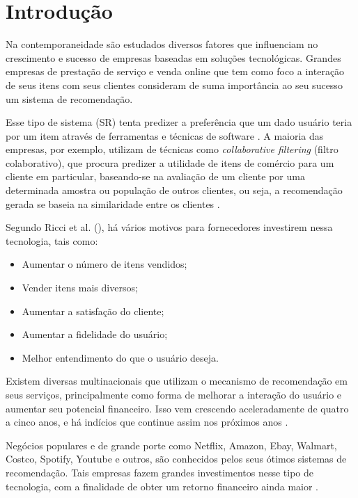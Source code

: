 \chapter{Introdução}

Na contemporaneidade são estudados diversos fatores que influenciam no crescimento e sucesso de empresas baseadas em soluções tecnológicas. Grandes empresas de prestação de serviço e venda online que tem como foco a interação de seus itens com seus clientes consideram de suma importância ao seu sucesso um sistema de recomendação.

Esse tipo de sistema (SR) tenta predizer a preferência que um dado usuário teria por um item através de ferramentas e técnicas de software \cite{souza:2014}. A maioria das empresas, por exemplo, utilizam de técnicas como \textit{collaborative filtering} (filtro colaborativo), que procura predizer a utilidade de itens de comércio para um cliente em particular, baseando-se na avaliação de um cliente por uma determinada amostra ou população de outros clientes, ou seja, a recomendação gerada se baseia na similaridade entre os clientes \cite{Linden:2003}.

Segundo Ricci et al. (\citeyear{Ricci:2010}), há vários motivos para fornecedores investirem nessa tecnologia, tais como:

\begin{itemize}
    \item Aumentar o número de itens vendidos;
    \item Vender itens mais diversos;
    \item Aumentar a satisfação do cliente;
    \item Aumentar a fidelidade do usuário;
    \item Melhor entendimento do que o usuário deseja.
\end{itemize}

Existem diversas multinacionais que utilizam o mecanismo de recomendação em seus serviços, principalmente como forma de melhorar a interação do usuário e aumentar seu potencial financeiro. Isso vem crescendo aceleradamente de quatro a cinco anos, e há indícios que continue assim nos próximos anos \cite{Underwood:2017}.

Negócios populares e de grande porte como Netflix, Amazon, Ebay, Walmart, Costco, Spotify, Youtube e outros, são conhecidos pelos seus ótimos sistemas de recomendação. Tais empresas fazem grandes investimentos nesse tipo de tecnologia, com a finalidade de obter um retorno financeiro ainda maior \cite{Underwood:2017}.

